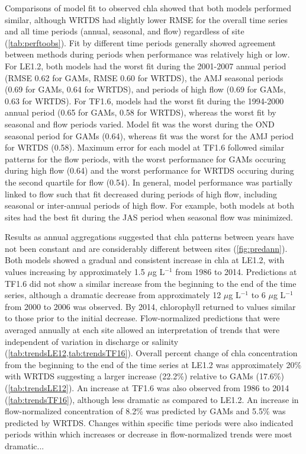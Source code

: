 \documentclass[letterpaper,12pt,oneside]{article}\usepackage[]{graphicx}\usepackage[]{color}
\newcommand{\mugl}{$\mu$g L$^{-1}$ }
\begin{document}
Comparisons of model fit to observed \ac{chla} showed that both models performed similar, although \ac{WRTDS} had slightly lower \ac{RMSE} for the overall time series and all time periods (annual, seasonal, and flow) regardless of site (\cref{tab:perftoobs}).  Fit by different time periods generally showed agreement between methods during periods when performance was relatively high or low.  For LE1.2, both models had the worst fit during the 2001-2007 annual period (\ac{RMSE} 0.62 for \acp{GAM}, \ac{RMSE} 0.60 for \ac{WRTDS}), the \ac{AMJ} seasonal periods (0.69 for \acp{GAM}, 0.64 for \ac{WRTDS}), and periods of high flow (0.69 for \acp{GAM}, 0.63 for \ac{WRTDS}).  For TF1.6, models had the worst fit during the 1994-2000 annual period (0.65 for \acp{GAM}, 0.58 for \ac{WRTDS}), whereas the worst fit by seasonal and flow periods varied.  Model fit was the worst during the \ac{OND} seasonal period for \acp{GAM} (0.64), whereas fit was the worst for the \ac{AMJ} period for \ac{WRTDS} (0.58).  Maximum error for each model at TF1.6 followed similar patterns for the flow periods, with the worst performance for \acp{GAM} occuring during high flow (0.64) and the worst performance for \ac{WRTDS} occuring during the second quartile for flow (0.54).  In general, model performance was partially linked to flow such that fit decreased during periods of high flow, including seasonal or inter-annual periods of high flow.  For example, both models at both sites had the best fit during the \ac{JAS} period when seasonal flow was minimized.



Results as annual aggregations suggested that \ac{chla} patterns between years have not been constant and are considerably different between sites (\cref{fig:predann}).  Both models showed a gradual and consistent increase in \ac{chla} at LE1.2, with values increasing by approximately 1.5 \mugl from 1986 to 2014.  Predictions at TF1.6 did not show a similar increase from the beginning to the end of the time series, although a dramatic decrease from approximately 12 \mugl to 6 \mugl from 2000 to 2006 was observed. By 2014, chlorophyll returned to values similar to those prior to the initial decrease.  Flow-normalized predictions that were averaged annually at each site allowed an interpretation of trends that were independent of variation in discharge or salinity (\cref{tab:trendsLE12,tab:trendsTF16}).  Overall percent change of \ac{chla} concentration from the beginning to the end of the time series at LE1.2 was approximately 20\% with \ac{WRTDS} suggesting a larger increase (22.2\%) relative to \acp{GAM} (17.6\%) (\cref{tab:trendsLE12}).  An increase at TF1.6 was also observed from 1986 to 2014 (\cref{tab:trendsTF16}), although less dramatic as compared to LE1.2.  An increase in flow-normalized concentration of 8.2\% was predicted by \acp{GAM} and 5.5\% was predicted by \ac{WRTDS}.  Changes within specific time periods were also indicated periods within which increases or decrease in flow-normalized trends were most dramatic...
\end{document}
